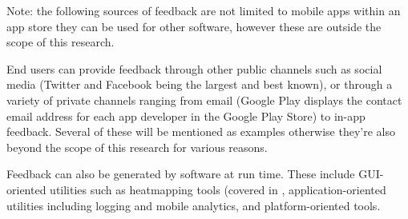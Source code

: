 Note: the following sources of feedback are not limited to mobile apps within an app store they can be used for other software, however these are outside the scope of this research.

End users can provide feedback through other public channels such as social media (Twitter and Facebook being the largest and best known), or through a variety of private channels ranging from email (Google Play displays the contact email address for each app developer in the Google Play Store) to in-app feedback. Several of these will be mentioned as examples otherwise they're also beyond the scope of this research for various reasons. 

Feedback can also be generated by software at run time. These include GUI-oriented utilities such as heatmapping tools (covered in , application-oriented utilities including logging and mobile analytics, and platform-oriented tools.



